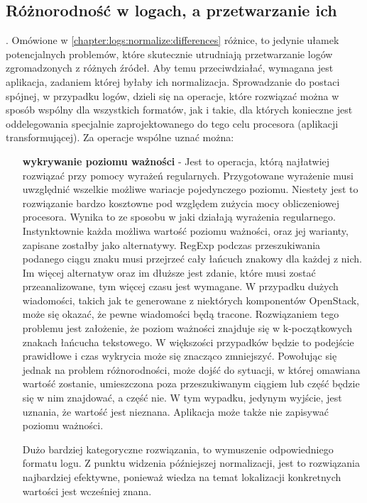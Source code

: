     \subsection{Różnorodność w logach, a przetwarzanie ich}.
    Omówione w \ref{chapter:logs:normalize:differences} różnice, to jedynie ułamek potencjalnych problemów, 
    które skutecznie utrudniają przetwarzanie logów zgromadzonych z różnych źródeł. Aby temu przeciwdziałać, wymagana jest
    aplikacja, zadaniem której byłaby ich normalizacja. Sprowadzanie do postaci spójnej, w przypadku logów, dzieli się
    na operacje, które rozwiązać można w sposób wspólny dla wszystkich formatów, jak i takie, dla których konieczne jest
    oddelegowania specjalnie zaprojektowanego do tego celu procesora (aplikacji transformującej). 
    Za operacje wspólne uznać można:
    \begin{itemize}
        \item[\textbf{wykrywanie poziomu ważności}] - Jest to operacja, którą najłatwiej rozwiązać przy pomocy wyrażeń regularnych.
        Przygotowane wyrażenie musi uwzględnić wszelkie możliwe wariacje pojedynczego poziomu. Niestety jest to
        rozwiązanie bardzo kosztowne pod względem zużycia mocy obliczeniowej procesora. Wynika to ze sposobu w jaki działają 
        wyrażenia regularnego. Instynktownie każda możliwa wartość poziomu ważności, oraz jej warianty, zapisane zostałby 
        jako alternatywy. RegExp podczas przeszukiwania podanego ciągu znaku musi przejrzeć cały łańcuch znakowy dla każdej z nich.
        Im więcej alternatyw oraz im dłuższe jest zdanie, które musi zostać przeanalizowane, tym więcej czasu jest wymagane.
        W przypadku dużych wiadomości, takich jak te generowane z niektórych komponentów OpenStack, może się okazać, że 
        pewne wiadomości będą tracone. Rozwiązaniem tego problemu jest założenie, że poziom ważności znajduje się w k-początkowych
        znakach łańcucha tekstowego. W większości przypadków będzie to podejście prawidłowe i czas wykrycia może się znacząco zmniejszyć.
        Powołując się jednak na problem różnorodności, może dojść do sytuacji, w której omawiana wartość zostanie, umieszczona
        poza przeszukiwanym ciągiem lub część będzie się w nim znajdować, a część nie. W tym wypadku, jedynym wyjście, jest uznania, że
        wartość jest nieznana. Aplikacja może także nie zapisywać poziomu ważności.
        
        Dużo bardziej kategoryczne rozwiązania, to wymuszenie odpowiedniego formatu logu. Z punktu
        widzenia późniejszej normalizacji, jest to rozwiązania najbardziej efektywne, ponieważ wiedza
        na temat lokalizacji konkretnych wartości jest wcześniej znana.
        

\end{itemize}
